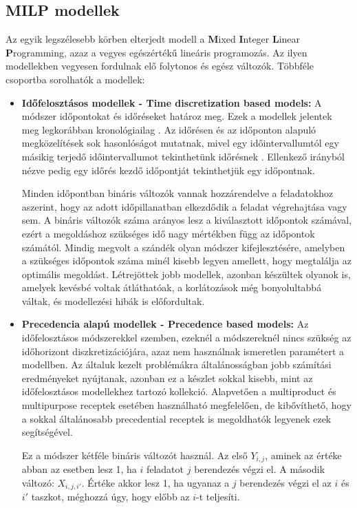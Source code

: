 \subsection{MILP modellek}
Az egyik legszélesebb körben elterjedt modell a \textbf{M}ixed \textbf{I}nteger \textbf{L}inear \textbf{P}rogramming, azaz a vegyes egészértékű lineáris programozás.
Az ilyen modellekben vegyesen fordulnak elő folytonos és egész változók. Többféle csoportba sorolhatók a modellek:
\begin{itemize}
  \item[] \textbf{Időfelosztásos modellek - Time discretization based models:}
  A módszer időpontokat és időréseket határoz meg.
  Ezek a modellek jelentek meg legkorábban kronológiailag \cite{kondili}.
  Az időrésen és az időponton alapuló megközelítések sok hasonlóságot mutatnak, mivel egy időintervallumtól egy másikig terjedő időintervallumot tekinthetünk időrésnek \cite{susarla}.
  Ellenkező irányból nézve pedig egy időrés kezdő időpontját tekinthetjük egy időpontnak.  
  
Minden időpontban bináris változók vannak hozzárendelve a feladatokhoz aszerint, hogy az adott időpillanatban elkezdődik a feladat végrehajtása vagy sem.
A bináris változók száma arányos lesz a kiválasztott időpontok számával, ezért a megoldáshoz szükséges idő nagy mértékben függ az időpontok számától.
Mindig megvolt a szándék olyan módszer kifejlesztésére, amelyben a szükséges időpontok száma minél kisebb legyen amellett, hogy megtalálja az optimális megoldást.
Létrejöttek jobb modellek, azonban készültek olyanok is, amelyek kevésbé voltak átláthatóak, a korlátozások még bonyolultabbá váltak, és modellezési hibák is előfordultak.
  
  \item[] \textbf{Precedencia alapú modellek - Precedence based models:}
  Az időfelosztásos módszerekkel szemben, ezeknél a módszereknél nincs szükség az időhorizont diszkretizációjára, azaz nem használnak ismeretlen paramétert a modellben.
  Az általuk kezelt problémákra általánosságban jobb számítási eredményeket nyújtanak, azonban ez a készlet sokkal kisebb, mint az időfelosztásos modellekhez tartozó kollekció.
  Alapvetően a multiproduct és multipurpose receptek esetében használható megfelelően, de kibővíthető, hogy a sokkal általánosabb precedential receptek is megoldhatók legyenek ezek segítségével. 
  
Ez a módszer kétféle bináris változót használ.
Az első $Y_{i,j}$, aminek az értéke abban az esetben lesz 1, ha $i$ feladatot $j$ berendezés végzi el.
A második változó: $X_{i,j,i'}$.
Értéke akkor lesz 1, ha ugyanaz a $j$ berendezés végzi el az $i$ és $i'$ taszkot, méghozzá úgy, hogy előbb az $i$-t teljesíti. 
\end{itemize}

